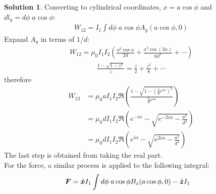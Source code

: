 \documentclass[letter,12pt]{article}
\theoremstyle{definition}
\newtheorem*{sol}{Solution}
\begin{document}
\begin{enumerate}
\begin{enumerate}
\begin{sol}
                    Converting to cylindrical coordinates, $x = a\cos \phi$ and $dl_y = d\phi \; a \cos\phi$:
                    \begin{align*}
                        W_{12} = I_1 \int d\phi \; a \cos \phi A_y(a \cos \phi, 0)
                    \end{align*}
                    Expand $A_y$ in terms of $1/d$:
                    \begin{align*}
                        W_{12} = \mu_0 I_1I_2
                        \left(
                            \frac{a^2 \cos{\alpha}}{2d}
                            +
                            \frac{a^4 \cos(3\alpha)}{8d^3}
                            +
                            \cdots
                        \right)
                    \end{align*}
                    \begin{align*}
                        \frac{1 - \sqrt{1-z^2}}{z} = \frac{z}{2} + \frac{z^3}{8} + \cdots
                    \end{align*}
                    therefore
                    \begin{align*}
                        W_{12}
                        &= \mu_0 a I_1I_2
                        \Re\left(
                            \frac{1 - \sqrt{1 - {(\frac{a}{d}e^{i\alpha})}^2}}{\frac{a}{d}e^{i\alpha}}
                        \right)
                        \\
                        &= \mu_0 d I_1I_2
                        \Re\left(
                            e^{-i\alpha}
                            -
                            \sqrt{e^{-2i\alpha} - \frac{a^2}{d^2}}
                        \right)
                        \\
                        &= \mu_0 d I_1I_2
                        \Re\left(
                            e^{i\alpha}
                            -
                            \sqrt{e^{2i\alpha} - \frac{a^2}{d^2}}
                        \right)
                    \end{align*}
                    The last step is obtained from taking the real part.
                    \\
                    For the force, a similar process is applied to the following integral:
                    \begin{align*}
                        \bs{F} &= \hat{\bs{x}} I_1
                        \int d\phi\; a \cos \phi B_z(a \cos \phi, 0)
                        -
                        \hat{\bs{z}}I_1

\end{align*}
\end{sol}
\end{enumerate}
\end{enumerate}
\end{document}
